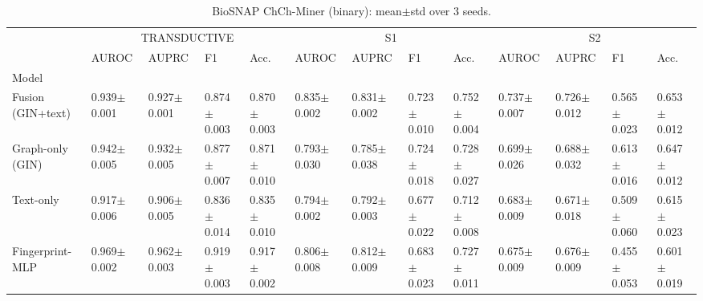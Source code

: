\begin{table}[t]
\caption{BioSNAP ChCh-Miner (binary): mean$\pm$std over 3 seeds.}
\label{tab:main-biosnap}
\begin{tabular}{lllllllllllll}
\toprule
 & \multicolumn{4}{c}{TRANSDUCTIVE} & \multicolumn{4}{c}{S1} & \multicolumn{4}{c}{S2} \\
 & AUROC & AUPRC & F1 & Acc. & AUROC & AUPRC & F1 & Acc. & AUROC & AUPRC & F1 & Acc. \\
Model &  &  &  &  &  &  &  &  &  &  &  &  \\
\midrule
Fusion (GIN+text) & 0.939$\pm$0.001 & 0.927$\pm$0.001 & 0.874$\pm$0.003 & 0.870$\pm$0.003 & 0.835$\pm$0.002 & 0.831$\pm$0.002 & 0.723$\pm$0.010 & 0.752$\pm$0.004 & 0.737$\pm$0.007 & 0.726$\pm$0.012 & 0.565$\pm$0.023 & 0.653$\pm$0.012 \\
Graph-only (GIN) & 0.942$\pm$0.005 & 0.932$\pm$0.005 & 0.877$\pm$0.007 & 0.871$\pm$0.010 & 0.793$\pm$0.030 & 0.785$\pm$0.038 & 0.724$\pm$0.018 & 0.728$\pm$0.027 & 0.699$\pm$0.026 & 0.688$\pm$0.032 & 0.613$\pm$0.016 & 0.647$\pm$0.012 \\
Text-only & 0.917$\pm$0.006 & 0.906$\pm$0.005 & 0.836$\pm$0.014 & 0.835$\pm$0.010 & 0.794$\pm$0.002 & 0.792$\pm$0.003 & 0.677$\pm$0.022 & 0.712$\pm$0.008 & 0.683$\pm$0.009 & 0.671$\pm$0.018 & 0.509$\pm$0.060 & 0.615$\pm$0.023 \\
Fingerprint-MLP & 0.969$\pm$0.002 & 0.962$\pm$0.003 & 0.919$\pm$0.003 & 0.917$\pm$0.002 & 0.806$\pm$0.008 & 0.812$\pm$0.009 & 0.683$\pm$0.023 & 0.727$\pm$0.011 & 0.675$\pm$0.009 & 0.676$\pm$0.009 & 0.455$\pm$0.053 & 0.601$\pm$0.019 \\
\bottomrule
\end{tabular}
\end{table}
